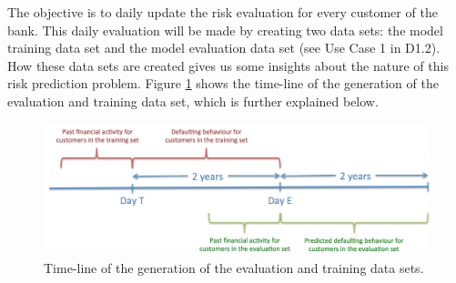 The objective is to daily update the risk evaluation for every customer of the bank. This daily evaluation will be made by creating two data sets: the model training data set and the model evaluation data set (see Use Case 1 in D1.2). How these data sets are created gives us some insights about the nature of this risk prediction problem.  Figure \ref{Figure:CajaMarTimeLine} shows the time-line of the generation of the evaluation and training data set, which is further explained below. 


\begin{figure}
\begin{center}
\includegraphics[scale=0.4]{figures/CajarMarTimeLine}
\caption{\label{Figure:CajaMarTimeLine}Time-line of the generation of the evaluation and training data sets.}
\end{center}
\end{figure}

